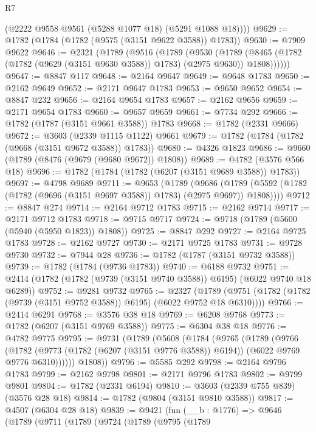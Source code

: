 \begin{lexlean}{R7}
\begin{coremodule}
        (@2222 @9558 @9561 (@5288 @1077 @18) (@5291 @1088 @18))))
@9629 := @1782 (@1784 (@1782 (@9575 (@3151 @9622 @3588)) @1783))
@9630 := @7909 @9622
@9646 := @2321
    (@1789
      (@9516
        (@1789
          (@9530
            (@1789
              (@8465 (@1782 (@1782 (@9629 (@3151 @9630 @3588)) @1783) (@2975 @9630)) @1808))))))
@9647 := @8847 @117
@9648 := @2164 @9647
@9649 := @9648 @1783
@9650 := @2162 @9649
@9652 := @2171 @9647 @1783
@9653 := @9650 @9652
@9654 := @8847 @232
@9656 := @2164 @9654 @1783
@9657 := @2162 @9656
@9659 := @2171 @9654 @1783
@9660 := @9657 @9659
@9661 := @7734 @292
@9666 := @1782 (@1787 (@3151 @9661 @3588)) @1783
@9668 := @1782 (@2331 @9666)
@9672 := @3603 (@2339 @1115 @1122) @9661
@9679 := @1782 (@1784 (@1782 (@9668 (@3151 @9672 @3588)) @1783))
@9680 := @4326 @1823
@9686 := @9660 (@1789 (@8476 (@9679 (@9680 @9672)) @1808))
@9689 := @4782 (@3576 @566 @18)
@9696 := @1782 (@1784 (@1782 (@6207 (@3151 @9689 @3588)) @1783))
@9697 := @4798 @9689
@9711 := @9653
    (@1789
      (@9686 (@1789 (@5592 (@1782 (@1782 (@9696 (@3151 @9697 @3588)) @1783) (@2975 @9697)) @1808))))
@9712 := @8847 @274
@9714 := @2164 @9712 @1783
@9715 := @2162 @9714
@9717 := @2171 @9712 @1783
@9718 := @9715 @9717
@9724 := @9718 (@1789 (@5600 (@5940 (@5950 @1823)) @1808))
@9725 := @8847 @292
@9727 := @2164 @9725 @1783
@9728 := @2162 @9727
@9730 := @2171 @9725 @1783
@9731 := @9728 @9730
@9732 := @7944 @28
@9736 := @1782 (@1787 (@3151 @9732 @3588))
@9739 := @1782 (@1784 (@9736 @1783))
@9740 := @6188 @9732
@9751 := @2414 (@1782 (@1782 (@9739 (@3151 @9740 @3588)) @6195) (@6022 @9740 @18 @6289))
@9752 := @9281 @9732
@9765 := @2327
    (@1789 (@9751 (@1782 (@1782 (@9739 (@3151 @9752 @3588)) @6195) (@6022 @9752 @18 @6310))))
@9766 := @2414 @6291
@9768 := @3576 @38 @18
@9769 := @6208 @9768
@9773 := @1782 (@6207 (@3151 @9769 @3588))
@9775 := @6304 @38 @18
@9776 := @4782 @9775
@9795 := @9731
    (@1789
      (@5608
        (@1784
          (@9765
            (@1789
              (@9766
                (@1782
                  (@9773 (@1782 (@6207 (@3151 @9776 @3588)) @6194))
                  (@6022 @9769 @9776 @6310))))))
        @1808))
@9796 := @5585 @292
@9798 := @2164 @9796 @1783
@9799 := @2162 @9798
@9801 := @2171 @9796 @1783
@9802 := @9799 @9801
@9804 := @1782 (@2331 @6194)
@9810 := @3603 (@2339 @755 @839) (@3576 @28 @18)
@9814 := @1782 (@9804 (@3151 @9810 @3588))
@9817 := @4507 (@6304 @28 @18)
@9839 := @9421
    (fun (__b : @1776) =>
    @9646
      (@1789
        (@9711
          (@1789
            (@9724
              (@1789
                (@9795
                  (@1789

\end{coremodule}
\end{lexlean}
